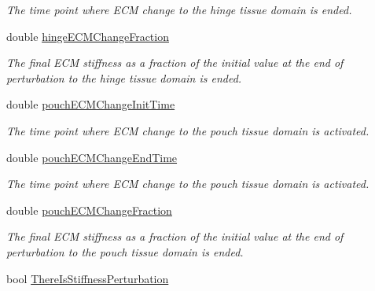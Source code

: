 \begin{DoxyCompactItemize}
\begin{DoxyCompactList}\small\item\em The time point where E\+C\+M change to the hinge tissue domain is ended. \end{DoxyCompactList}\item 
\hypertarget{classSimulation_a2fcc51c4065261a6fa1308e40d6c18d2}{}double \hyperlink{classSimulation_a2fcc51c4065261a6fa1308e40d6c18d2}{hinge\+E\+C\+M\+Change\+Fraction}\label{classSimulation_a2fcc51c4065261a6fa1308e40d6c18d2}

\begin{DoxyCompactList}\small\item\em The final E\+C\+M stiffness as a fraction of the initial value at the end of perturbation to the hinge tissue domain is ended. \end{DoxyCompactList}\item 
\hypertarget{classSimulation_abe2da9f9cfd0abfe8d4530cc332f301d}{}double \hyperlink{classSimulation_abe2da9f9cfd0abfe8d4530cc332f301d}{pouch\+E\+C\+M\+Change\+Init\+Time}\label{classSimulation_abe2da9f9cfd0abfe8d4530cc332f301d}

\begin{DoxyCompactList}\small\item\em The time point where E\+C\+M change to the pouch tissue domain is activated. \end{DoxyCompactList}\item 
\hypertarget{classSimulation_abbb40a5902677375bd7d4f30336accb1}{}double \hyperlink{classSimulation_abbb40a5902677375bd7d4f30336accb1}{pouch\+E\+C\+M\+Change\+End\+Time}\label{classSimulation_abbb40a5902677375bd7d4f30336accb1}

\begin{DoxyCompactList}\small\item\em The time point where E\+C\+M change to the pouch tissue domain is activated. \end{DoxyCompactList}\item 
\hypertarget{classSimulation_a7767563df2d0e9f4d9191dbb6742a6ca}{}double \hyperlink{classSimulation_a7767563df2d0e9f4d9191dbb6742a6ca}{pouch\+E\+C\+M\+Change\+Fraction}\label{classSimulation_a7767563df2d0e9f4d9191dbb6742a6ca}

\begin{DoxyCompactList}\small\item\em The final E\+C\+M stiffness as a fraction of the initial value at the end of perturbation to the pouch tissue domain is ended. \end{DoxyCompactList}\item 
\hypertarget{classSimulation_afe8a88fffd9016ee11e7e2575109d437}{}bool \hyperlink{classSimulation_afe8a88fffd9016ee11e7e2575109d437}{There\+Is\+Stiffness\+Perturbation}\label{classSimulation_afe8a88fffd9016ee11e7e2575109d437}


\end{DoxyCompactItemize}
